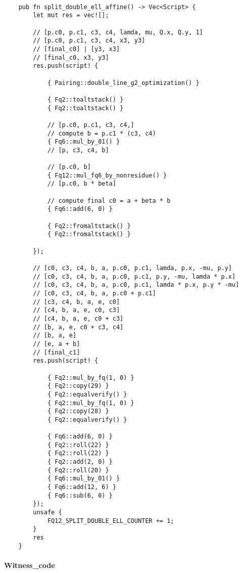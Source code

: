 \begin{lstlisting}

    pub fn split_double_ell_affine() -> Vec<Script> {
        let mut res = vec![];

        // [p.c0, p.c1, c3, c4, lamda, mu, Q.x, Q.y, 1]
        // [p.c0, p.c1, c3, c4, x3, y3]
        // [final_c0] | [y3, x3]
        // [final_c0, x3, y3]
        res.push(script! {

            { Pairing::double_line_g2_optimization() }

            { Fq2::toaltstack() }
            { Fq2::toaltstack() }

            // [p.c0, p.c1, c3, c4,]
            // compute b = p.c1 * (c3, c4)
            { Fq6::mul_by_01() }
            // [p, c3, c4, b]

            // [p.c0, b]
            { Fq12::mul_fq6_by_nonresidue() }
            // [p.c0, b * beta]

            // compute final c0 = a + beta * b
            { Fq6::add(6, 0) }

            { Fq2::fromaltstack() }
            { Fq2::fromaltstack() }

        });

        // [c0, c3, c4, b, a, p.c0, p.c1, lamda, p.x, -mu, p.y]
        // [c0, c3, c4, b, a, p.c0, p.c1, p.y, -mu, lamda * p.x]
        // [c0, c3, c4, b, a, p.c0, p.c1, lamda * p.x, p.y * -mu]
        // [c0, c3, c4, b, a, p.c0 + p.c1]
        // [c3, c4, b, a, e, c0]
        // [c4, b, a, e, c0, c3]
        // [c4, b, a, e, c0 + c3]
        // [b, a, e, c0 + c3, c4]
        // [b, a, e]
        // [e, a + b]
        // [final_c1]
        res.push(script! {

            { Fq2::mul_by_fq(1, 0) }
            { Fq2::copy(29) }
            { Fq2::equalverify() }
            { Fq2::mul_by_fq(1, 0) }
            { Fq2::copy(28) }
            { Fq2::equalverify() }

            { Fq6::add(6, 0) }
            { Fq2::roll(22) }
            { Fq2::roll(22) }
            { Fq2::add(2, 0) }
            { Fq2::roll(20) }
            { Fq6::mul_by_01() }
            { Fq6::add(12, 6) }
            { Fq6::sub(6, 0) }
        });
        unsafe {
            FQ12_SPLIT_DOUBLE_ELL_COUNTER += 1;
        }
        res
    }

\end{lstlisting}

\paragraph*{Witness\_code}

